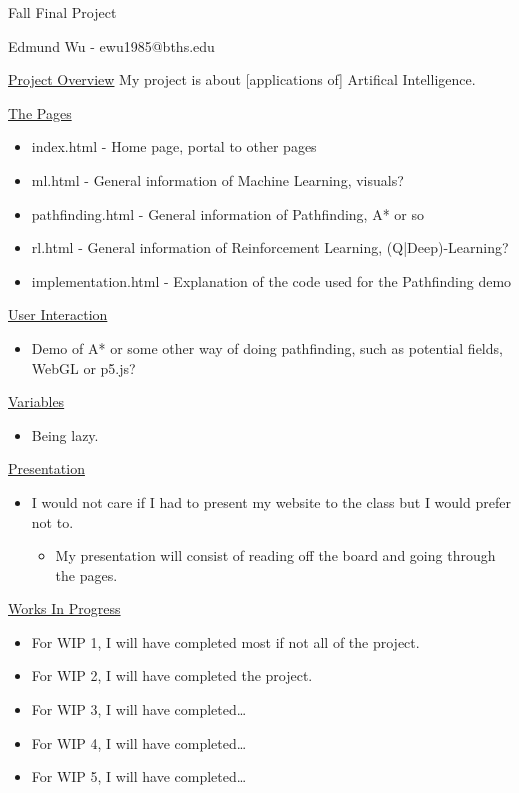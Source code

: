 \documentclass[fontsize=11bp]{article}
\author{Edmund Wu}
\date{Dec 19, 2017}
\begin{document}
\begin{center}
  Fall Final Project

  Edmund Wu {\hyp} ewu1985@bths.edu
\end{center}

\underline{Project Overview} \newline
My project is about [applications of] Artifical Intelligence.

\underline{The Pages}
\begin{itemize}
  \item index.html {\hyp} Home page, portal to other pages
  \item ml.html {\hyp} General information of Machine Learning, visuals?
  \item pathfinding.html {\hyp} General information of Pathfinding, A* or so
  \item rl.html {\hyp} General information of Reinforcement Learning, (Q|Deep)-Learning?
  \item implementation.html {\hyp} Explanation of the code used for the Pathfinding demo
\end{itemize}

\underline{User Interaction}
\begin{itemize}
  \item Demo of A* or some other way of doing pathfinding, such as potential fields, WebGL or p5.js?
\end{itemize}

\underline{Variables}
\begin{itemize}
  \item Being lazy.
\end{itemize}

\underline{Presentation}
\begin{itemize}
  \item I would not care if I had to present my website to the class but I would prefer not to.
  \begin{itemize}
    \item My presentation will consist of reading off the board and going through the pages.
  \end{itemize}
\end{itemize}

\underline{Works In Progress}
\begin{itemize}
  \item For WIP 1, I will have completed most if not all of the project.
  \item For WIP 2, I will have completed the project.
  \item For WIP 3, I will have completed{\ldots}
  \item For WIP 4, I will have completed{\ldots}
  \item For WIP 5, I will have completed{\ldots}
\end{itemize}
\end{document}
